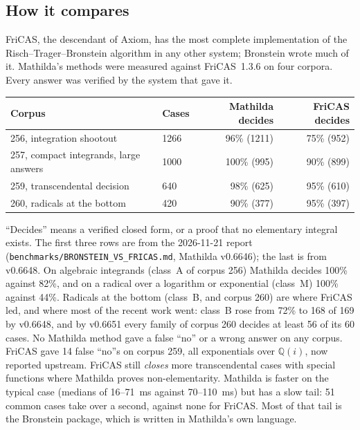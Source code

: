 \subsection{How it compares}
\label{ssec:int-fricas}

FriCAS, the descendant of Axiom, has the most complete implementation of the
Risch--Trager--Bronstein algorithm in any other system; Bronstein wrote much of it.
Mathilda's methods were measured against FriCAS~1.3.6 on four corpora. Every
answer was verified by the system that gave it.

\begin{center}
\small
\begin{tabular}{@{}llrr@{}}
\hline
Corpus & Cases & Mathilda decides & FriCAS decides\\
\hline
256, integration shootout & 1266 & 96\% (1211) & 75\% (952)\\
257, compact integrands, large answers & 1000 & 100\% (995) & 90\% (899)\\
259, transcendental decision & 640 & 98\% (625) & 95\% (610)\\
260, radicals at the bottom & 420 & 90\% (377) & 95\% (397)\\
\hline
\end{tabular}
\end{center}

``Decides'' means a verified closed form, or a proof that no elementary integral
exists. The first three rows are from the 2026-11-21 report
(\texttt{benchmarks/BRONSTEIN\_VS\_FRICAS.md}, Mathilda v0.6646); the last is from
v0.6648. On algebraic integrands (class~A of corpus 256) Mathilda decides 100\%
against 82\%, and on a radical over a logarithm or exponential (class~M) 100\%
against 44\%. Radicals at the bottom (class~B, and corpus 260) are where FriCAS led,
and where most of the recent work went: class~B rose from 72\% to 168 of 169 by
v0.6648, and by v0.6651 every family of corpus 260 decides at least 56 of its 60
cases. No Mathilda method gave a false ``no'' or a wrong answer on any corpus.
FriCAS gave 14 false ``no''s on corpus 259, all exponentials over
\(\mathbb{Q}(i)\), now reported upstream. FriCAS still \emph{closes} more
transcendental cases with special functions where Mathilda proves
non-elementarity. Mathilda is faster on the typical case (medians of 16--71~ms
against 70--110~ms) but has a slow tail: 51 common cases take over a second, against
none for FriCAS. Most of that tail is the Bronstein package, which is written in
Mathilda's own language.

